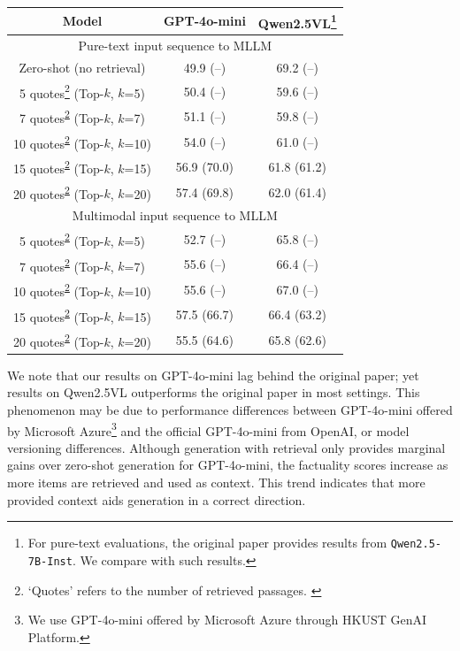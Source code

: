 \begin{tabularx}{\textwidth}{@{} c | c c @{}}
    \toprule
    Model & GPT-4o-mini & Qwen2.5VL\footnote{For pure-text evaluations, the original paper provides results from \verb|Qwen2.5-7B-Inst|. We compare with such results.} \\
    \midrule
    \endhead
    \multicolumn{3}{c}{Pure-text input sequence to MLLM} \\
    \midrule
    Zero-shot (no retrieval) & 49.9 (--) & 69.2 (--) \\
    \midrule
    5 quotes\footnote{`Quotes' refers to the number of retrieved passages. \label{mmdocragquotes}} (Top-$k$, $k$=5) & 50.4 (--) & 59.6 (--) \\
    7 quotes\textsuperscript{\ref{mmdocragquotes}} (Top-$k$, $k$=7) & 51.1 (--) & 59.8 (--) \\
    10 quotes\textsuperscript{\ref{mmdocragquotes}} (Top-$k$, $k$=10) & 54.0 (--) & 61.0 (--) \\
    15 quotes\textsuperscript{\ref{mmdocragquotes}} (Top-$k$, $k$=15) & 56.9 (70.0) & 61.8 (61.2) \\
    20 quotes\textsuperscript{\ref{mmdocragquotes}} (Top-$k$, $k$=20) & 57.4 (69.8) & 62.0 (61.4) \\
    \midrule
    \multicolumn{3}{c}{Multimodal input sequence to MLLM} \\
    \midrule
    5 quotes\textsuperscript{\ref{mmdocragquotes}} (Top-$k$, $k$=5) & 52.7 (--) & 65.8 (--) \\
    7 quotes\textsuperscript{\ref{mmdocragquotes}} (Top-$k$, $k$=7) & 55.6 (--) & 66.4 (--) \\
    10 quotes\textsuperscript{\ref{mmdocragquotes}} (Top-$k$, $k$=10) & 55.6 (--) & 67.0 (--) \\
    15 quotes\textsuperscript{\ref{mmdocragquotes}} (Top-$k$, $k$=15) & 57.5 (66.7) & 66.4 (63.2) \\
    20 quotes\textsuperscript{\ref{mmdocragquotes}} (Top-$k$, $k$=20) & 55.5 (64.6) & 65.8 (62.6) \\
    \bottomrule
\end{tabularx}

We note that our results on GPT-4o-mini lag behind the original paper; yet results on Qwen2.5VL outperforms the original paper in most settings.
This phenomenon may be due to performance differences between GPT-4o-mini offered by Microsoft Azure\footnote{We use GPT-4o-mini offered by Microsoft Azure through HKUST GenAI Platform.}
and the official GPT-4o-mini from OpenAI, or model versioning differences.
Although generation with retrieval only provides marginal gains over zero-shot generation for GPT-4o-mini,
the factuality scores increase as more items are retrieved and used as context.
This trend indicates that more provided context aids generation in a correct direction.

